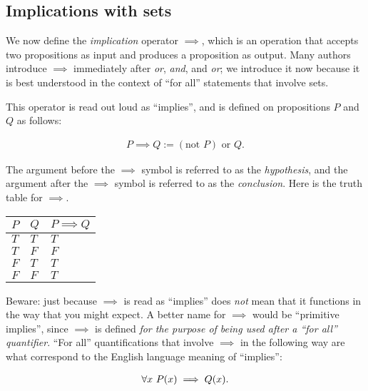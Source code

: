 \newpage

\subsection*{Implications with sets}

We now define the \textit{implication} operator $\implies$, which is an operation that accepts two propositions as input and produces a proposition as output. Many authors introduce $\implies$ immediately after \textit{or}, \textit{and}, and \textit{or}; we introduce it now because it is best understood in the context of ``for all'' statements that involve sets.

This operator is read out loud as ``implies'', and is defined on propositions $P$ and $Q$ as follows:

\begin{align*}
    P \implies Q := (\text{not } P) \text{ or } Q.
\end{align*}

The argument before the $\implies$ symbol is referred to as the \textit{hypothesis}, and the argument after the $\implies$ symbol is referred to as the \textit{conclusion}. Here is the truth table for $\implies$.

\begin{table}[H]
    \centering
    \begin{tabular}{|l|l|l|}
    \hline
    $P$ & $Q$ & $P \implies Q$ \\ \hline
    $T$ & $T$ & $T$        \\ \hline
    $T$ & $F$ & $F$        \\ \hline
    $F$ & $T$ & $T$        \\ \hline
    $F$ & $F$ & $T$        \\ \hline
    \end{tabular}
\end{table}

Beware: just because $\implies$ is read as ``implies'' does \textit{not} mean that it functions in the way that you might expect. A better name for $\implies$ would be ``primitive implies'', since $\implies$ is defined \textit{for the purpose of being used after a ``for all'' quantifier}. ``For all'' quantifications that involve $\implies$ in the following way are what correspond to the English language meaning of ``implies'':

\begin{align*}
    \forall x \text{ } P(x) \implies Q(x).
\end{align*}

